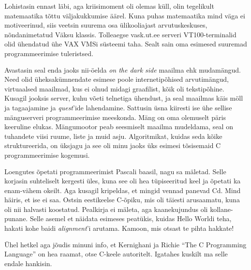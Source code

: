 Lohistasin ennast läbi, aga kriisimoment oli olemas 
küll, olin tegelikult matemaatika tõttu väljakukkumise äärel. Kuna puhas matemaatika mind väga ei motiveerinud, siis veetsin suurema osa 
ülikooliajast 
arvutuskeskuses, 
nõndanimetatud Väksu klassis\label{sisu:vase_klass}. Tolleaegse 
vask.ut.ee serveri VT100-terminalid olid ühendatud ühe 
VAX VMSi süsteemi taha. Sealt sain oma esimesed suuremad 
programmeerimise tuleristsed. 

Avastasin seal enda jaoks 
nii-öelda \emph{on the dark side} maailma ehk
mudamängud. Need olid üheksakümnendate 
esimese poole internetipõhised arvutimängud, virtuaalsed maailmad, kus ei olnud 
midagi graafilist, kõik oli tekstipõhine. Kusagil jooksis server, 
kuhu võeti telnetiga ühendust, ja seal maailmas käis möll ja 
tagaajamine ja \emph{quest}'ide lahendamine. Sattusin üsna kiiresti ise ühe sellise mänguserveri 
programmeerimise meeskonda. Mäng on oma 
olemuselt päris keeruline elukas. Mängumootor peab 
seesmiselt maailma mudeldama, seal on tuhandete viisi 
ruume, liste ja muid asju. Algoritmikat, kuidas seda kõike 
struktureerida, on üksjagu ja see oli minu jaoks üks esimesi tõsisemaid 
C programmeerimise kogemusi. 


Loengutes õpetati programmeerimist Pascali baasil, 
nagu sa mäletad. Selle korjasin suhteliselt kergesti üles, kuna see oli 
hea tüpiseeritud keel ja õpetati ka enam-vähem okeilt. Aga kusagil kripeldas, et mingid vennad panevad Cd. Mind
häiris, et ise ei saa. Ostsin eestikeelse C-õpiku, mis oli 
täiesti arusaamatu, kuna oli nii halvasti koostatud. Pealkirja ei mäleta, aga kaanekujundus oli kollane-punane. Selle asemel et näidata esimeses peatükis, kuidas Hello 
Worldi teha, hakati kohe baidi \emph{alignment}'i 
arutama. Kamoon, mis otsast te pihta hakkate! 

Ühel hetkel aga 
jõudis minuni info, et Kernighani ja Richie \enquote{The C Programming 
Language} on hea raamat, otse C-keele autoritelt. 
Igatahes kuskilt ma selle endale hankisin. 


